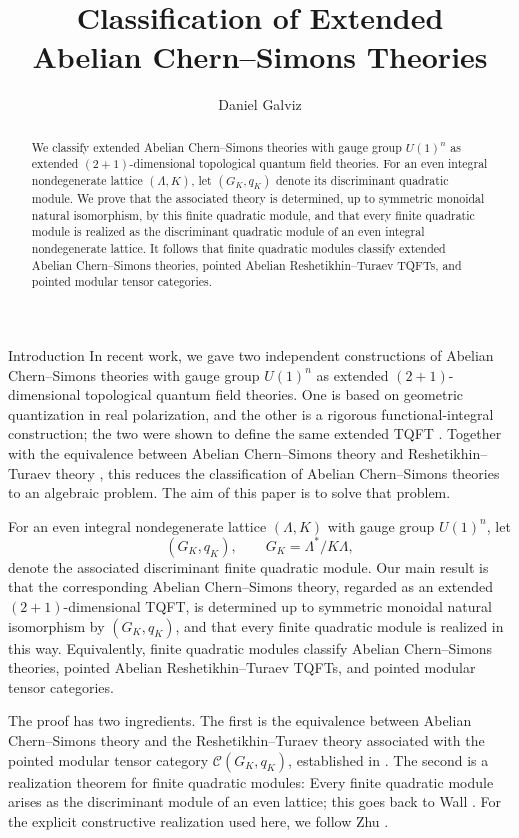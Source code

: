 \documentclass[12pt]{amsart}
\title[Classification of  Extended Abelian Chern--Simons Theories]{Classification of Extended\\ Abelian Chern--Simons Theories}
\author{Daniel Galviz}
\date{}
\makeatletter
\renewcommand\section{\@startsection{section}{1}%
  \z@{.7\linespacing\@plus\linespacing}{.5\linespacing}%
  {\normalfont\bfseries\centering}}
\numberwithin{equation}{section}
\makeatother
\begin{document}
\begin{abstract}
We classify extended Abelian Chern--Simons theories  with gauge group $U(1)^n$ as extended $(2+1)$-dimensional topological quantum field theories. For an even integral nondegenerate lattice $(\Lambda,K)$, let $(G_K,q_K)$ denote its discriminant quadratic module. We prove that the associated theory is determined, up to symmetric monoidal natural isomorphism, by this finite quadratic module, and that every finite quadratic module is realized as the discriminant quadratic module of an even integral nondegenerate lattice. It follows that finite quadratic modules classify extended Abelian Chern--Simons theories, pointed Abelian Reshetikhin--Turaev TQFTs, and pointed modular tensor categories.
\end{abstract}

\maketitle
\section{Introduction}
In recent work, we gave two independent constructions of Abelian Chern--Simons theories with gauge group $U(1)^n$ as extended $(2+1)$-dimensional topological quantum field theories. One is based on geometric quantization in real polarization, and the other is a rigorous functional-integral construction; the two were shown to define the same extended TQFT \cite{Galviz2,Galviz3.5}. Together with the equivalence between Abelian Chern--Simons theory and Reshetikhin--Turaev theory \cite{Galviz1,Galviz3}, this reduces the classification of Abelian Chern--Simons theories to an algebraic problem.   The aim of this paper is to solve that problem.

For an even integral nondegenerate lattice $(\Lambda,K)$ with gauge group $U(1)^n$, let
\[
(G_K,q_K), \qquad G_K=\Lambda^*/K\Lambda,
\]
denote the associated discriminant finite quadratic module. Our main result is that the corresponding Abelian Chern--Simons theory, regarded as an extended $(2+1)$-dimensional TQFT, is determined up to symmetric monoidal natural isomorphism by $(G_K,q_K)$, and that every finite quadratic module is realized in this way. Equivalently, finite quadratic modules classify  Abelian Chern--Simons theories, pointed Abelian Reshetikhin--Turaev TQFTs, and pointed modular tensor categories.

The proof has two ingredients. The first is the equivalence between Abelian Chern--Simons theory and the Reshetikhin--Turaev theory associated with the pointed modular tensor category $\mathcal{C}(G_K,q_K)$, established in \cite{Galviz1,Galviz3}. The second is a realization theorem for finite quadratic modules: Every finite quadratic module arises as the discriminant module of an even lattice; this goes back to Wall \cite[\S 6]{Wall1963}. For the explicit constructive realization used here, we follow Zhu \cite{Zhu2021}.
\end{document}
